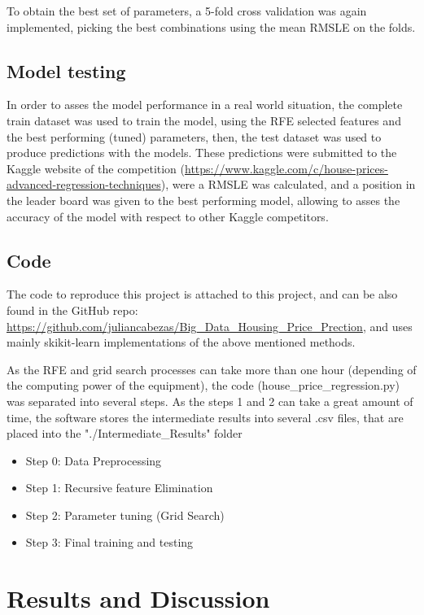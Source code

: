 \documentclass[11pt,onecolumn,titlepage,letterpaper]{article}
\begin{document}
To obtain the best set of parameters, a 5-fold cross validation was again implemented, picking the best combinations using the mean RMSLE on the folds.

\subsection{Model testing}

In order to asses the model performance in a real world situation, the complete train dataset was used to train the model, using the RFE selected features and the best performing (tuned) parameters, then, the test dataset was used to produce predictions with the models. These predictions were submitted to the Kaggle website of the competition (\url{https://www.kaggle.com/c/house-prices-advanced-regression-techniques}), were a RMSLE was calculated, and a position in the leader board was given to the best performing model, allowing to asses the accuracy of the model with respect to other Kaggle competitors.

\subsection{Code}

The code to reproduce this project is attached to this project, and can be also found in the GitHub repo: \url{https://github.com/juliancabezas/Big_Data_Housing_Price_Prection}, and uses mainly skikit-learn implementations \cite{Pedregosa2011} of the above mentioned methods.

As the RFE and grid search processes can take more than one hour (depending of the computing power of the equipment), the code (house\_price\_regression.py) was separated into several steps. As the steps 1 and 2 can take a great amount of time, the software stores the intermediate results into several .csv files, that are placed into the "./Intermediate\_Results" folder

\begin{itemize}
	\item Step 0: Data Preprocessing
	\item Step 1: Recursive feature Elimination
	\item Step 2: Parameter tuning (Grid Search)
	\item Step 3: Final training and testing
\end{itemize}


\section{Results and Discussion}
\end{document}
